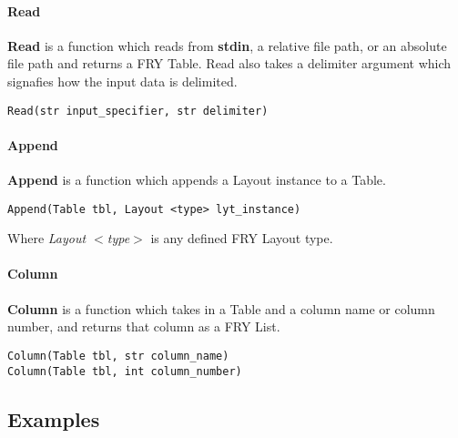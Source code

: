 \documentclass{article}
\begin{document}
\paragraph{Read}
\textbf{Read} is a function which reads from \textbf{stdin}, a relative file path, or an absolute file path and returns a FRY Table. Read also takes a delimiter argument which signafies how the input data is delimited.
\begin{lstlisting}
Read(str input_specifier, str delimiter)
\end{lstlisting}

\paragraph{Append}
\textbf{Append} is a function which appends a Layout instance to a Table.
\begin{lstlisting}
Append(Table tbl, Layout <type> lyt_instance)
\end{lstlisting}
Where \emph{Layout $<$type$>$} is any defined FRY Layout type.

\paragraph{Column}
\textbf{Column} is a function which takes in a Table and a column name or column number, and returns that column as a FRY List.
\begin{lstlisting}
Column(Table tbl, str column_name)
Column(Table tbl, int column_number)
\end{lstlisting}

\subsection{Examples}
\end{document}
